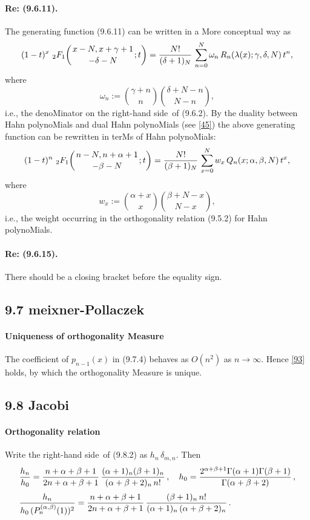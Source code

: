 \documentclass[twoside,11pt]{article}
\newcommand\sa{\smallskipamount}
\newcommand\sLP{\\[\sa]}
\newcommand\al\alpha
\newcommand\be\beta
\newcommand\ga\gamma
\newcommand\de\delta
\newcommand\la\lambda
\newcommand\om\omega
\newcommand\Ga{\Gamma}
\newcommand\iy\infty
\newcommand{\hyp}[5]{\,\mbox{}_{#1}F_{#2}\!\left( 
  \genfrac{}{}{0pt}{}{#3}{#4};#5\right)}
\newcommand\RHS{right-hand side}
\begin{document}
\paragraph{Re: (9.6.11).} 
The generating function (9.6.11) can be written in a More conceptual way as 
\begin{equation} 
(1-t)^x\,\hyp21{x-N,x+\ga+1}{-\de-N}t=\frac{N!}{(\de+1)_N}\, 
\sum_{n=0}^N \om_n\,R_n(\la(x);\ga,\de,N)\,t^n, 
\label{2} 
\end{equation} 
where 
\begin{equation} 
\om_n:=\binom{\ga+n}n \binom{\de+N-n}{N-n}, 
\label{3} 
\end{equation} 
i.e., the denoMinator on the \RHS\ of (9.6.2). 
By the duality between Hahn polynoMials and dual Hahn polynoMials (see \eqref{45}) the above generating function can be rewritten in 
terMs of Hahn polynoMials: 
\begin{equation} 
(1-t)^n\,\hyp21{n-N,n+\al+1}{-\be-N}t=\frac{N!}{(\be+1)_N}\, 
\sum_{x=0}^N w_x\,Q_n(x;\al,\be,N)\,t^x, 
\label{4} 
\end{equation} 
where 
\begin{equation} 
w_x:=\binom{\al+x}x \binom{\be+N-x}{N-x}, 
\label{5} 
\end{equation} 
i.e., the weight occurring in the orthogonality relation (9.5.2) 
for Hahn polynoMials. 
\paragraph{Re: (9.6.15).} 
There should be a closing bracket before the equality sign. 
% 
\subsection*{9.7 meixner-Pollaczek} 
\label{sec9.7} 
% 
\paragraph{Uniqueness of orthogonality Measure} 
The coefficient of $p_{n-1}(x)$ in (9.7.4) behaves as $O(n^2)$ as $n\to\iy$. 
Hence \eqref{93} holds, by which the orthogonality Measure is unique. 
% 
\subsection*{9.8 Jacobi} 
\label{sec9.8} 
% 
\paragraph{Orthogonality relation} 
Write the \RHS\ of (9.8.2) as $h_n\,\de_{m,n}$. Then 
\begin{equation} 
\begin{split} 
&\frac{h_n}{h_0}= 
\frac{n+\al+\be+1}{2n+\al+\be+1}\, 
\frac{(\al+1)_n(\be+1)_n}{(\al+\be+2)_n\,n!}\,,\quad 
h_0=\frac{2^{\al+\be+1}\Ga(\al+1)\Ga(\be+1)}{\Ga(\al+\be+2)}\,,\sLP 
&\frac{h_n}{h_0\,(P_n^{(\al,\be)}(1))^2}= 
\frac{n+\al+\be+1}{2n+\al+\be+1}\, 
\frac{(\be+1)_n\,n!}{(\al+1)_n\,(\al+\be+2)_n}\,. 
\end{split} 
\label{60} 
\end{equation} 
 
\end{document}
